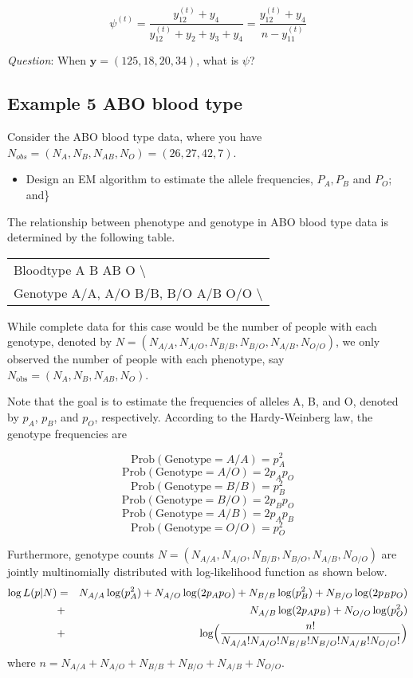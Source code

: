\documentclass[]{article}
\providecommand{\tightlist}{%
  \setlength{\itemsep}{0pt}\setlength{\parskip}{0pt}}
\begin{document}
\[\psi^{(t)} =\frac{y_{12}^{(t)}+y_4}{y_{12}^{(t)} + y_2+y_3+y_4} = \frac{y_{12}^{(t)}+y_4}{n-y_{11}^{(t)}}\]

\emph{Question}: When \(\mathbf{y} = (125, 18, 20, 34)\), what is
\(\psi\)?

\vskip 15pt

\hypertarget{example-5-abo-blood-type}{%
\subsection{Example 5 ABO blood type}\label{example-5-abo-blood-type}}

Consider the ABO blood type data, where you have
\(N_{obs} = (N_{A},N_{B},N_{AB}, N_{O}) = (26, 27, 42, 7)\).

\begin{itemize}
\tightlist
\item
  Design an EM algorithm to estimate the allele frequencies,
  \(P_A, P_B\) and \(P_O\); and\}
\end{itemize}

The relationship between phenotype and genotype in ABO blood type data
is determined by the following table.

\begin{longtable}[]{@{}l@{}}
\toprule
\endhead
Bloodtype A \textbar{} B \textbar{} AB \textbar{} O
\textbackslash{}\tabularnewline
Genotype A/A, A/O \textbar{} B/B, B/O \textbar{} A/B \textbar{} O/O
\textbackslash{}\tabularnewline
\bottomrule
\end{longtable}

While complete data for this case would be the number of people with
each genotype, denoted by
\(N=(N_{A/A}, N_{A/O}, N_{B/B}, N_{B/O}, N_{A/B}, N_{O/O})\), we only
observed the number of people with each phenotype, say
\(N_{\text{obs}} = (N_{A}, N_{B}, N_{AB}, N_{O})\).

Note that the goal is to estimate the frequencies of alleles A, B, and
O, denoted by \(p_A\), \(p_B\), and \(p_O\), respectively. According to
the Hardy-Weinberg law, the genotype frequencies are

\[\mbox{Prob} (\mbox{Genotype} = A/A) = p_A^2\]
\[\mbox{Prob} (\mbox{Genotype} = A/O) = 2p_A p_O\]
\[\mbox{Prob} (\mbox{Genotype} = B/B ) = p_B^2\]
\[\mbox{Prob} (\mbox{Genotype} = B/O) = 2p_B p_O\]
\[\mbox{Prob} (\mbox{Genotype} = A/B) = 2p_A p_B\]
\[\mbox{Prob} (\mbox{Genotype} =  O/O ) = p_O^2\]

Furthermore, genotype counts
\(N=(N_{A/A}, N_{A/O}, N_{B/B}, N_{B/O}, N_{A/B}, N_{O/O})\) are jointly
multinomially distributed with log-likelihood function as shown below.
\begin{eqnarray*}
\log L(p | N) &=& N_{A/A} \log(p_A^2) + N_{A/O} \log (2 p_A p_O) + N_{B/B} \log(p_B^2) +  N_{B/O} \log(2 p_B p_O) \\
&+& N_{A/B} \log(2 p_A p_B) + N_{O/O} \log(p_O^2) \\
&+& \log \Bigl(\frac{n!}{N_{A/A}! N_{A/O}! N_{B/B}! N_{B/O}! N_{A/B}! N_{O/O}!}\Bigr)
\end{eqnarray*} where
\(n=N_{A/A} + N_{A/O} + N_{B/B} + N_{B/O} + N_{A/B} + N_{O/O}\).
\end{document}

